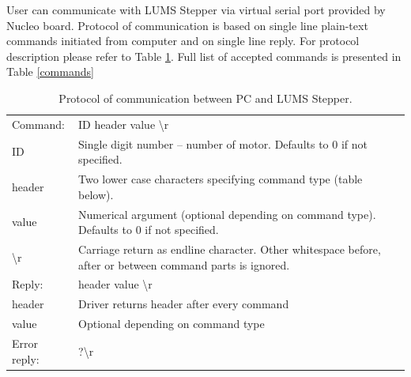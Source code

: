 \documentclass[10pt,article]{article}
\begin{document}
User can communicate with LUMS Stepper via virtual serial port provided by Nucleo board. Protocol of communication is based on single line plain-text commands initiated from computer and on single line reply. For protocol description please refer to Table \ref{protocol}. Full list of accepted commands is presented in Table \ref{commands}

\begin{table}[ht]\centering
\begin{tabularx}{\textwidth}{ll}
\rowcolor[gray]{0.80} Command: & ID header value \textbackslash r \\
\rowcolor[gray]{0.95} ID & Single digit number – number of motor. Defaults to 0 if not specified.\\
\rowcolor[gray]{0.95} header & Two lower case characters specifying command type (table below).\\
\rowcolor[gray]{0.95} value & Numerical argument (optional depending on command type). Defaults to 0 if not specified. \\
\rowcolor[gray]{0.95} \textbackslash r\ & Carriage return as endline character. Other whitespace before, after or between command parts is ignored. \\
\rowcolor[gray]{0.95} 
\rowcolor[gray]{0.80} Reply: & header value \textbackslash r\\
\rowcolor[gray]{0.95} header & Driver returns header after every command \\
\rowcolor[gray]{0.95} value & Optional depending on command type\\
\rowcolor[gray]{0.80}
Error reply: & ?\textbackslash r\  \\
\end{tabularx}
\caption{Protocol of communication between PC and LUMS Stepper.}\label{protocol}
\end{table}
\end{document}
